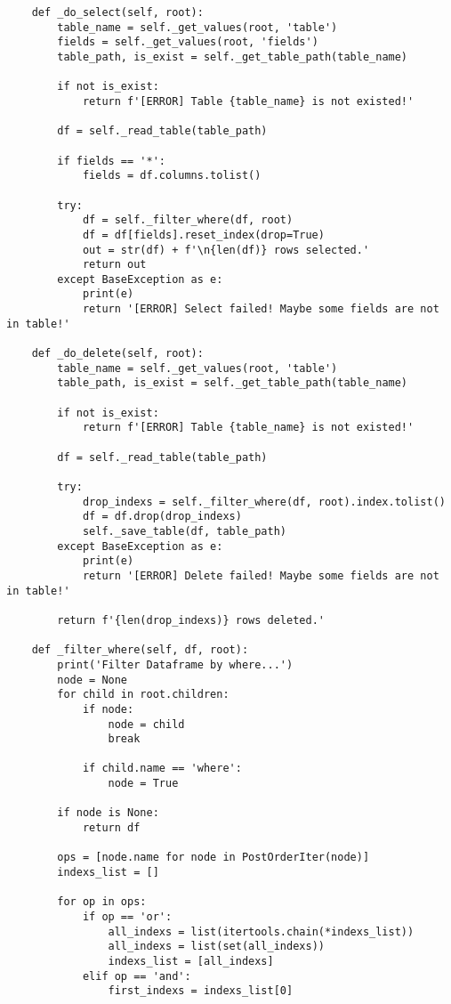 \begin{appendix}
\begin{lstlisting}
    def _do_select(self, root):
        table_name = self._get_values(root, 'table')
        fields = self._get_values(root, 'fields')
        table_path, is_exist = self._get_table_path(table_name)

        if not is_exist:
            return f'[ERROR] Table {table_name} is not existed!'
        
        df = self._read_table(table_path)
        
        if fields == '*':
            fields = df.columns.tolist()
        
        try:
            df = self._filter_where(df, root)
            df = df[fields].reset_index(drop=True)
            out = str(df) + f'\n{len(df)} rows selected.'
            return out
        except BaseException as e:
            print(e)
            return '[ERROR] Select failed! Maybe some fields are not in table!'
    
    def _do_delete(self, root):
        table_name = self._get_values(root, 'table')
        table_path, is_exist = self._get_table_path(table_name)

        if not is_exist:
            return f'[ERROR] Table {table_name} is not existed!'
        
        df = self._read_table(table_path)
        
        try:
            drop_indexs = self._filter_where(df, root).index.tolist()
            df = df.drop(drop_indexs)
            self._save_table(df, table_path)
        except BaseException as e:
            print(e)
            return '[ERROR] Delete failed! Maybe some fields are not in table!'
            
        return f'{len(drop_indexs)} rows deleted.'
    
    def _filter_where(self, df, root):
        print('Filter Dataframe by where...')
        node = None
        for child in root.children:
            if node:
                node = child
                break

            if child.name == 'where':
                node = True

        if node is None:
            return df
        
        ops = [node.name for node in PostOrderIter(node)]
        indexs_list = []
        
        for op in ops:
            if op == 'or':
                all_indexs = list(itertools.chain(*indexs_list))
                all_indexs = list(set(all_indexs))
                indexs_list = [all_indexs]
            elif op == 'and':
                first_indexs = indexs_list[0]


\end{lstlisting}
\end{appendix}
